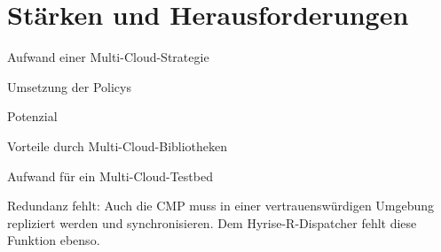\section{Stärken und Herausforderungen}



Aufwand einer Multi-Cloud-Strategie

Umsetzung der Policys

Potenzial

Vorteile durch Multi-Cloud-Bibliotheken

Aufwand für ein Multi-Cloud-Testbed

Redundanz fehlt: Auch die CMP muss in einer vertrauenswürdigen Umgebung repliziert werden und synchronisieren. Dem Hyrise-R-Dispatcher fehlt diese Funktion ebenso.